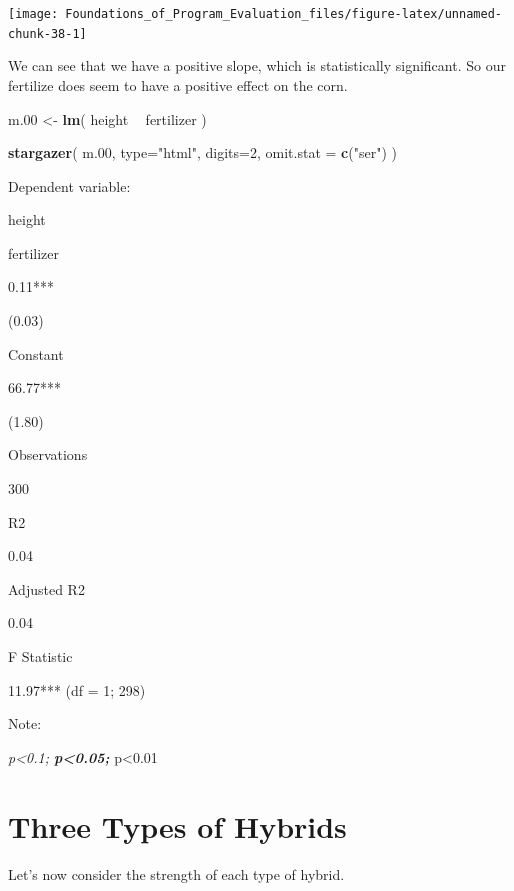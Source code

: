 \documentclass[]{book}
\newenvironment{Shaded}{\begin{snugshade}}{\end{snugshade}}
\newcommand{\DataTypeTok}[1]{\textcolor[rgb]{0.13,0.29,0.53}{#1}}
\newcommand{\DecValTok}[1]{\textcolor[rgb]{0.00,0.00,0.81}{#1}}
\newcommand{\FloatTok}[1]{\textcolor[rgb]{0.00,0.00,0.81}{#1}}
\newcommand{\KeywordTok}[1]{\textcolor[rgb]{0.13,0.29,0.53}{\textbf{#1}}}
\newcommand{\NormalTok}[1]{#1}
\newcommand{\OperatorTok}[1]{\textcolor[rgb]{0.81,0.36,0.00}{\textbf{#1}}}
\newcommand{\StringTok}[1]{\textcolor[rgb]{0.31,0.60,0.02}{#1}}
\theoremstyle{definition}
\theoremstyle{definition}
\theoremstyle{definition}
\theoremstyle{remark}
\begin{document}
\begin{center}\texttt{[image: Foundations\_of\_Program\_Evaluation\_files/figure-latex/unnamed-chunk-38-1]} \end{center}

We can see that we have a positive slope, which is statistically
significant. So our fertilize does seem to have a positive effect on the
corn.

\begin{Shaded}
\begin{Highlighting}[]


\NormalTok{m}\FloatTok{.00}\NormalTok{ <-}\StringTok{ }\KeywordTok{lm}\NormalTok{( height }\OperatorTok{~}\StringTok{ }\NormalTok{fertilizer )}


\KeywordTok{stargazer}\NormalTok{( m}\FloatTok{.00}\NormalTok{, }\DataTypeTok{type=}\StringTok{"html"}\NormalTok{, }
           \DataTypeTok{digits=}\DecValTok{2}\NormalTok{, }\DataTypeTok{omit.stat =} \KeywordTok{c}\NormalTok{(}\StringTok{"ser"}\NormalTok{) )}
\end{Highlighting}
\end{Shaded}

Dependent variable:

height

fertilizer

0.11***

(0.03)

Constant

66.77***

(1.80)

Observations

300

R2

0.04

Adjusted R2

0.04

F Statistic

11.97*** (df = 1; 298)

Note:

\emph{p\textless{}0.1; \textbf{p\textless{}0.05; }}p\textless{}0.01

\hypertarget{three-types-of-hybrids}{%
\section{Three Types of Hybrids}\label{three-types-of-hybrids}}

Let's now consider the strength of each type of hybrid.
\end{document}
